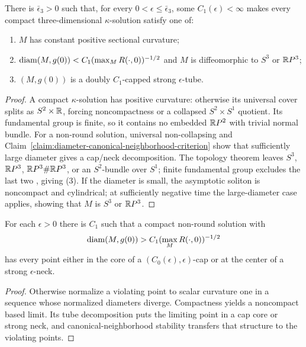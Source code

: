 \begin{theorem}\label{thm:compact-kappa-solution-structure}
\label{thmep3}

There is $\bar\epsilon_3>0$ such that, for every
$0<\epsilon\leq\bar\epsilon_3$, some $C_1(\epsilon)<\infty$ makes
every compact three-dimensional $\kappa$-solution satisfy one of:
\begin{enumerate}
\item[(1)] $M$ has constant positive sectional curvature;
\item[(2)]
$\operatorname{diam}(M,g(0))<C_1(\max_MR(\cdot,0))^{-1/2}$ and $M$ is
diffeomorphic to $S^3$ or $\mathbb{R} P^3$;
\item[(3)] $(M,g(0))$ is a doubly $C_1$-capped strong
$\epsilon$-tube.
\end{enumerate}
\end{theorem}
\begin{proof}
\sketch

A compact $\kappa$-solution has positive curvature: otherwise its
universal cover splits as $S^2\times\mathbb{R}$, forcing noncompactness or
a collapsed $S^2\times S^1$ quotient. Its fundamental group is
finite, so it contains no embedded $\mathbb{R} P^2$ with trivial normal
bundle. For a non-round solution, universal non-collapsing and
Claim~\ref{claim:diameter-canonical-neighborhood-criterion} show
that sufficiently large diameter gives a cap/neck decomposition.
The topology theorem leaves $S^3$, $\mathbb{R} P^3$,
$\mathbb{R} P^3\#\mathbb{R} P^3$, or an $S^2$-bundle over $S^1$; finite
fundamental group excludes the last two \cite{Petersen}, giving (3).
If the diameter is small, the asymptotic soliton is noncompact and
cylindrical; at sufficiently negative time the large-diameter case
applies, showing that $M$ is $S^3$ or $\mathbb{R} P^3$.
\end{proof}

\begin{claim}\label{claim:diameter-canonical-neighborhood-criterion}

For each $\epsilon>0$ there is $C_1$ such that a compact non-round
solution with
\[
 \operatorname{diam}(M,g(0))>C_1(\max_MR(\cdot,0))^{-1/2}
\]
has every point either in the core of a
$(C_0(\epsilon),\epsilon)$-cap or at the center of a strong
$\epsilon$-neck.
\end{claim}
\begin{proof}
\sketch
{}
Otherwise normalize a violating point to scalar curvature one in a
sequence whose normalized diameters diverge. Compactness yields a
noncompact based limit. Its tube decomposition puts the limiting
point in a cap core or strong neck, and canonical-neighborhood
stability transfers that structure to the violating points.
\end{proof}

